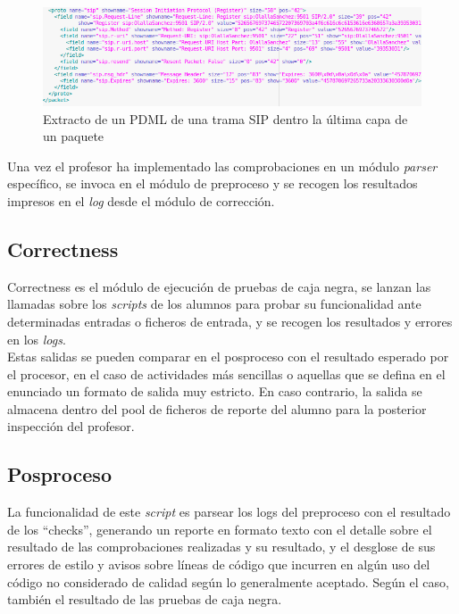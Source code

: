 \begin{figure}[H]
   \centering
   \includegraphics[width=16cm]{img/Selection_015_pdml_2}
   \caption{Extracto de un PDML de una trama SIP dentro la última capa de un paquete}
   \label{figura:extracto_pdml}
\end{figure}


Una vez el profesor ha implementado las comprobaciones en un módulo \textit{parser} específico, se invoca en el módulo de preproceso y se recogen los resultados impresos en el \textit{log} desde el módulo de corrección.


\subsection{Correctness}
\label{sec:correctness}


Correctness es el módulo de ejecución de pruebas de caja negra, se lanzan las llamadas sobre los \textit{scripts} de los alumnos para probar su funcionalidad ante determinadas entradas o ficheros de entrada, y se recogen los resultados y errores en los \textit{logs}.\\


Estas salidas se pueden comparar en el posproceso con el resultado esperado por el procesor, en el caso de actividades más sencillas o aquellas que se defina en el enunciado un formato de salida muy estricto. En caso contrario, la salida se almacena dentro del pool de ficheros de reporte del alumno para la posterior inspección del profesor.\\


\subsection{Posproceso}
\label{sec:posproceso}


La funcionalidad de este \textit{script} es parsear los logs del preproceso con el resultado de los ``checks'', generando un reporte en formato texto con el detalle sobre el resultado de las comprobaciones realizadas y su resultado, y el desglose de sus errores de estilo y avisos sobre líneas de código que incurren en algún uso del código no considerado de calidad según lo generalmente aceptado. Según el caso, también el resultado de las pruebas de caja negra.


